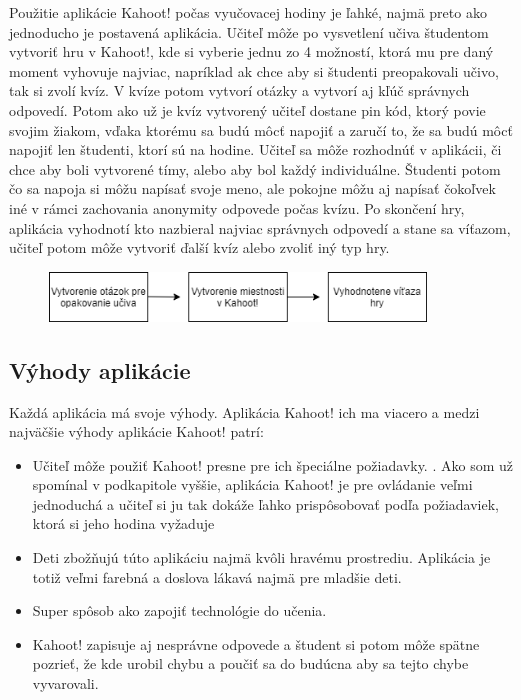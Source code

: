 \documentclass[10pt,oneside,slovak,a4paper]{article}
\begin{document}
Použitie aplikácie Kahoot! počas vyučovacej hodiny je ľahké, najmä preto ako jednoducho je postavená aplikácia\cite{Licorish}. Učiteľ môže po vysvetlení učiva študentom vytvoriť hru v Kahoot!, kde si vyberie jednu zo 4 možností, ktorá mu pre daný moment vyhovuje najviac, napríklad ak chce aby si študenti preopakovali učivo, tak si zvolí kvíz. V kvíze potom vytvorí otázky a vytvorí aj kľúč správnych odpovedí. Potom ako už je kvíz vytvorený učiteľ dostane pin kód, ktorý povie svojim žiakom, vďaka ktorému sa budú môcť napojiť a zaručí to, že sa budú môcť napojiť len študenti, ktorí sú na hodine. Učiteľ sa môže rozhodnúť v aplikácii, či chce aby boli vytvorené tímy, alebo aby bol každý individuálne. Študenti potom čo sa napoja si môžu napísať svoje meno, ale pokojne môžu aj napísať čokoľvek iné v rámci zachovania anonymity odpovede  počas kvízu\cite{WANG2020}. Po skončení hry, aplikácia vyhodnotí kto nazbieral najviac správnych odpovedí a stane sa víťazom, učiteľ potom môže vytvoriť ďalší kvíz alebo zvoliť iný typ hry. 
\begin{figure}[h] %
\centering
\includegraphics[width=10cm]{diagram.png}


\end{figure}

\subsection{Výhody aplikácie} \label{ina:este}
Každá aplikácia má svoje výhody. Aplikácia Kahoot! ich ma viacero a medzi najväčšie výhody aplikácie Kahoot! patrí: 
\begin{itemize}
\item	Učiteľ môže použiť Kahoot! presne pre ich špeciálne požiadavky. \cite{Lauren}. Ako som už spomínal v podkapitole vyššie, aplikácia Kahoot! je pre ovládanie veľmi jednoduchá a učiteľ si ju tak dokáže ľahko prispôsobovať podľa požiadaviek, ktorá si jeho hodina vyžaduje
\item	Deti zbožňujú túto aplikáciu najmä kvôli hravému prostrediu.\cite{Lauren} Aplikácia je totiž veľmi farebná a doslova lákavá najmä pre mladšie deti. 
\item	Super spôsob ako zapojiť technológie do učenia.\cite{Lauren}
\item	Kahoot! zapisuje aj nesprávne odpovede a študent si potom môže spätne pozrieť, že kde urobil chybu a poučiť sa do budúcna aby sa tejto chybe vyvarovali. \cite{Lauren}


\end {itemize}
\end{document}
